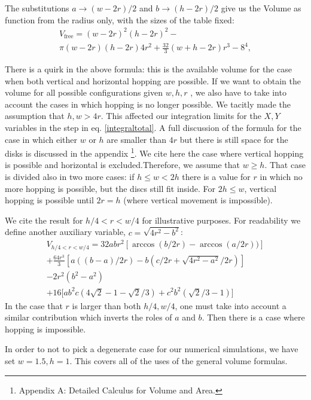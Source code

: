 \documentclass[letterpaper,10pt, jcp, aps]{revtex4-1}
\begin{document}
The substitutions $a\rightarrow (w-2r)/2$ and $b\rightarrow (h-2r)/2$ give us
 the Volume as function from the radius only, with the sizes of the table fixed:
\begin{multline}\label{volumewhd}
 V_\text{free} 
= (w-2r)^{2} (h-2r)^{2}  - \\ 
 \pi (w-2r)(h-2r) 4 r^{2} + 
\textstyle \frac{32}{3} (w+h-2r) r^{3}  
- 8^{4},
\end{multline}

There is a quirk in the above formula:
this is the available volume for the case when both
vertical and horizontal hopping are possible.
If we want to obtain the volume for all possible configurations
given $w,h,r$ ,
we also have to take into account the cases in which hopping is no
longer possible. 
We tacitly made the assumption that $h,w>4r$.  This affected our 
integration limits for the $X,Y$ variables in the step in eq. \ref{integraltotal}. 
A full discussion of the formula for the case in which either
$w$ or $h$ are smaller than $4r$ but there is still space for
the disks is discussed in the appendix
\footnote{Appendix A: Detailed Calculus for Volume and Area.}.
We cite here the case where vertical hopping is possible
and horizontal is excluded.Therefore, we assume that $w \geq h$.
That case is divided also in two more cases: if
$ h \leq  w < 2 h $ there is a value for $r$ in which no more hopping is possible,
but the discs still fit inside. For $ 2 h \leq w $, vertical hopping is
possible until $ 2 r= h$ (where vertical movement is impossible).

We cite the  result for $h/4  <r< w/4$ for illustrative purposes.
For readability we define another auxiliary variable,
$c=\sqrt{4r^2-b^2}$:
\begin{multline}\label{VolumenCasoFeo}
V_{h/4<r<w/4} = 32abr^2[\arccos(b/2r)-\arccos(a/2r))]\\
+\frac{64 r^3}{3 }[a((b-a)/2r)-b(c/2r+\sqrt{4r^2-a^2}/2r)]\\
-2r^2 (b^2-a^2)\\ 
+16[ a b^2 c (4\sqrt{2}-1-\sqrt{2}/3)
+c^2b^2 (\sqrt{2}/3-1) \big]
\end{multline}
In the case that $r$ is larger than both $h/4, w/4$, one must take
into account a similar
contribution which inverts the roles of $a$ and $b$. Then there is
a case where hopping is impossible. 


In order to not to pick a degenerate case for our numerical simulations,
we have set $w=1.5, h=1$. This covers all of the uses of the general volume formulas.
\end{document}
